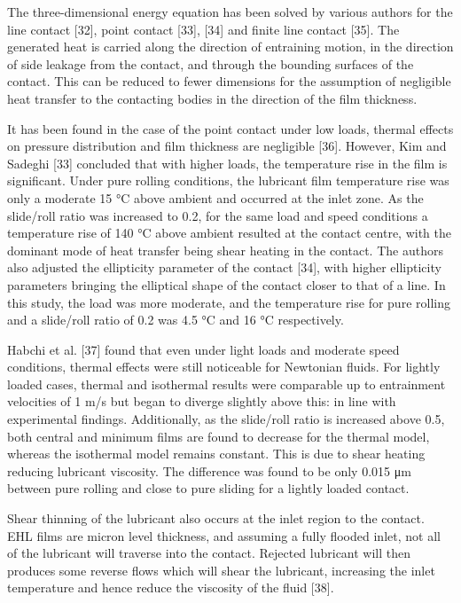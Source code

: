 The three-dimensional energy equation has been solved by various authors for the line contact [32], point contact [33], [34] and finite line contact [35]. The generated heat is carried along the direction of entraining motion, in the direction of side leakage from the contact, and through the bounding surfaces of the contact. This can be reduced to fewer dimensions for the assumption of negligible heat transfer to the contacting bodies in the direction of the film thickness.

It has been found in the case of the point contact under low loads, thermal effects on pressure distribution and film thickness are negligible [36]. However, Kim and Sadeghi [33] concluded that with higher loads, the temperature rise in the film is significant. Under pure rolling conditions, the lubricant film temperature rise was only a moderate 15 °C above ambient and occurred at the inlet zone. As the slide/roll ratio was increased to 0.2, for the same load and speed conditions a temperature rise of 140 °C above ambient resulted at the contact centre, with the dominant mode of heat transfer being shear heating in the contact. The authors also adjusted the ellipticity parameter of the contact [34], with higher ellipticity parameters bringing the elliptical shape of the contact closer to that of a line. In this study, the load was more moderate, and the temperature rise for pure rolling and a slide/roll ratio of 0.2 was 4.5 °C and 16 °C respectively.

Habchi et al. [37] found that even under light loads and moderate speed conditions, thermal effects were still noticeable for Newtonian fluids. For lightly loaded cases, thermal and isothermal results were comparable up to entrainment velocities of 1 m/s but began to diverge slightly above this: in line with experimental findings. Additionally, as the slide/roll ratio is increased above 0.5, both central and minimum films are found to decrease for the thermal model, whereas the isothermal model remains constant. This is due to shear heating reducing lubricant viscosity. The difference was found to be only 0.015 μm between pure rolling and close to pure sliding for a lightly loaded contact.

Shear thinning of the lubricant also occurs at the inlet region to the contact. EHL films are micron level thickness, and assuming a fully flooded inlet, not all of the lubricant will traverse into the contact. Rejected lubricant will then produces some reverse flows which will shear the lubricant, increasing the inlet temperature and hence reduce the viscosity of the fluid [38].


